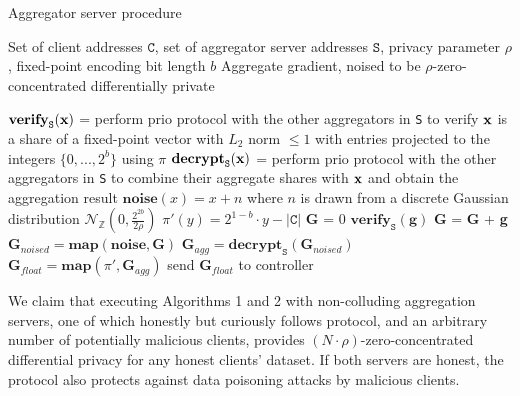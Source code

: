\documentclass{article}
\begin{document}
\begin{algorithm}[h]
  \caption{Aggregator server procedure}\label{alg:server}
  \begin{algorithmic}[1]
  \Require Set of client addresses $\texttt{C}$, set of aggregator server addresses $\texttt{S}$, privacy parameter $\rho$, fixed-point encoding bit length $b$
  \Ensure Aggregate gradient, noised to be $\rho$-zero-concentrated differentially private

  \State$\textbf{verify}_{\texttt{S}}(\textbf x)$ = perform prio protocol with the other aggregators in \texttt{S} to verify $\textbf x$ is a share of a fixed-point vector with $L_2$ norm $\leq 1$ with entries projected to the integers $\{0,...,2^b\}$ using $\pi$
  \State$\textbf{decrypt}_{\texttt{S}}(\textbf x)$ = perform prio protocol with the other aggregators in \texttt{S} to combine their aggregate shares with $\textbf x$ and obtain the aggregation result
  \State$\textbf{noise}(x) = x+n$ where $n$ is drawn from a discrete Gaussian distribution $\mathcal N_\mathbb{Z}\left(0,\frac{2^{2b}}{2\rho}\right)$
  \State$\pi'(y) = 2^{1-b} \cdot y - |\texttt{C}|$ 
  \State\textbf{G} = 0
	   \State$\textbf{verify}_\texttt{S}(\textbf{g})$ \label{lst:line:verify}
	   \State\textbf{G} = \textbf{G} + \textbf{g}
  \EndFor
  \State$\textbf{G}_{noised} = \textbf{map}(\textbf{noise}, \textbf{G})$   \label{lst:line:noise}
  \State$\textbf{G}_{agg} = \textbf{decrypt}_{\texttt{S}}(\textbf{G}_{noised})$ 
  \State$\textbf{G}_{float} = \textbf{map}(\pi', \textbf{G}_{agg})$ 
  \State send $\textbf{G}_{float}$ to controller
  \end{algorithmic}
\end{algorithm}

We claim that executing Algorithms 1 and 2 with non-colluding aggregation servers, one of which honestly but curiously follows protocol, and an arbitrary number of potentially malicious clients, provides $(N \cdot \rho)$-zero-concentrated differential privacy for any honest clients' dataset. If both servers are honest, the protocol also protects against data poisoning attacks by malicious clients.
\end{document}
